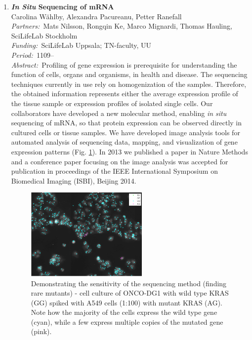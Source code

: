 \documentclass[10pt, a4paper]{article}
\newcommand{\aabstract}[1]{\emph{Abstract:~}#1}
\newcommand{\ffunding}[1]{\emph{Funding:~}#1\\}
\newcommand{\ppartners}[1]{\emph{Partners:~}#1\\}
\newcommand{\pperiod}[1]{\emph{Period:~}#1\\}
\begin{document}
\begin{enumerate}
\item 
\textbf{\emph{In Situ} Sequencing of mRNA}\\
Carolina W\"{a}hlby, Alexandra Pacureanu, Petter Ranefall \\
\ppartners{Mats Nilsson, Rongqin Ke, Marco Mignardi, Thomas Hauling, SciLifeLab Stockholm}
\ffunding{SciLifeLab Uppsala; TN-faculty, UU}
\pperiod{1109--}
\aabstract{Profiling of gene expression is prerequisite for understanding the function of cells, organs and organisms, in health and disease. The sequencing techniques currently in use rely on homogenization of the samples. Therefore, the obtained information represents either the average expression profile of the tissue sample or expression profiles of isolated single cells. Our collaborators have developed a new molecular method, enabling \emph{in situ} sequencing of mRNA, so that protein expression can be observed directly in cultured cells or tissue samples. We have developed image analysis tools for automated analysis of sequencing data, mapping, and visualization of gene expression patterns (Fig. \ref{fig:carolina_insitu}). In 2013 we published a paper in Nature Methods and a conference paper focusing on the image analysis was accepted for publication in proceedings of the IEEE International Symposium on Biomedical Imaging (ISBI), Beijing 2014.}

\begin{figure}[!tb]
\centering
\includegraphics[width=0.56\textwidth]{figures/research/insitu.png}
\caption{\label{fig:carolina_insitu} Demonstrating the sensitivity of the sequencing method (finding rare mutants) - cell culture of ONCO-DG1 with wild type KRAS (GG) spiked with A549 cells (1:100) with mutant KRAS (AG). Note how the majority of the cells express the wild type gene (cyan), while a few express multiple copies of the mutated gene (pink).} 
\end{figure}



\end{enumerate}
\end{document}
